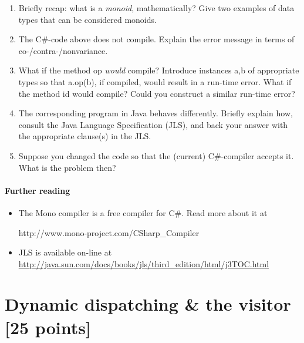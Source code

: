 \documentclass{article}
\newcommand{\mycomment}[1]{}
\begin{document}
\begin{enumerate}
\item Briefly recap: what is a \textit{monoid}, mathematically? Give two examples
of data types that can be considered monoids.
\item The C\#-code above does not compile. Explain the error message
in terms of co-/contra-/nonvariance.
\item What if the method \textsf{op} \textit{would} compile? 
Introduce instances \textsf{a,b} of appropriate types so that
\textsf{a.op(b)}, if compiled, would result in a run-time error.
What if the method 
\textsf{id} would compile? Could you construct a similar run-time
error? 
\mycomment{
\item Show that the C\# type system would be \textit{unsound} if 
the code would compile without error (i.e., one could get a type error at
run time). Hint: define a second implementation of the 
\textsf{Monoid} interface, with
a (necessarily) different signature for the methods \textsf{op} and 
\textsf{id}; call \textsf{IntegerAdditiveMonoid.op()} with an object that
will cause a run-time error.
}
%
\item The corresponding program in Java behaves differently. Briefly
explain how, consult the Java Language Specification (JLS), and back your answer
with the appropriate clause(s) in the JLS.
\item Suppose you changed the code so that 
the (current) C\#-compiler accepts it. What is the problem then? 
\end{enumerate}

\paragraph{Further reading}
\begin{itemize}
\item The Mono compiler is a free compiler for C\#. Read more about it
at

\textsf{http://www.mono-project.com/CSharp\_Compiler}

\item JLS is available on-line 
 at 
\url{http://java.sun.com/docs/books/jls/third_edition/html/j3TOC.html}

\end{itemize}

\newpage
\section{Dynamic dispatching \& the visitor [25 points]}
\end{document}

